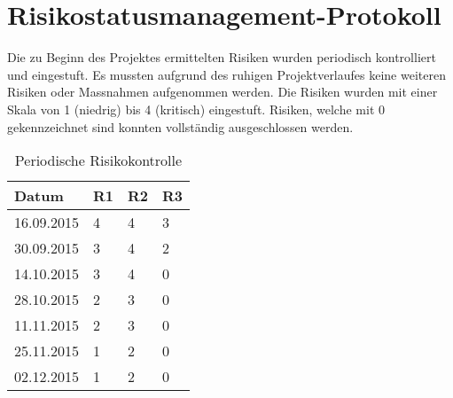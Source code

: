 \section{Risikostatusmanagement-Protokoll}
\label{sec:risk_management}

Die zu Beginn des Projektes ermittelten Risiken wurden periodisch kontrolliert und eingestuft. Es mussten aufgrund des ruhigen Projektverlaufes keine weiteren Risiken oder Massnahmen aufgenommen werden. Die Risiken wurden mit einer Skala von 1 (niedrig) bis 4 (kritisch) eingestuft. Risiken, welche mit 0 gekennzeichnet sind konnten vollständig ausgeschlossen werden.

\begin{table}[H]
\begin{center}
\begin{tabularx}{5.5cm}{ l | l | l | l}
\textbf{Datum} & \textbf{R1} & \textbf{R2} & \textbf{R3} \\ \hline
16.09.2015     & 4           & 4           & 3           \\ \hline
30.09.2015     & 3           & 4           & 2           \\ \hline
14.10.2015     & 3           & 4           & 0           \\ \hline
28.10.2015     & 2           & 3           & 0           \\ \hline
11.11.2015     & 2           & 3           & 0           \\ \hline
25.11.2015     & 1           & 2           & 0           \\ \hline
02.12.2015     & 1           & 2           & 0           \\ \hline
\end{tabularx}
\caption{Periodische Risikokontrolle}
\label{table:risks}
\end{center}
\end{table}